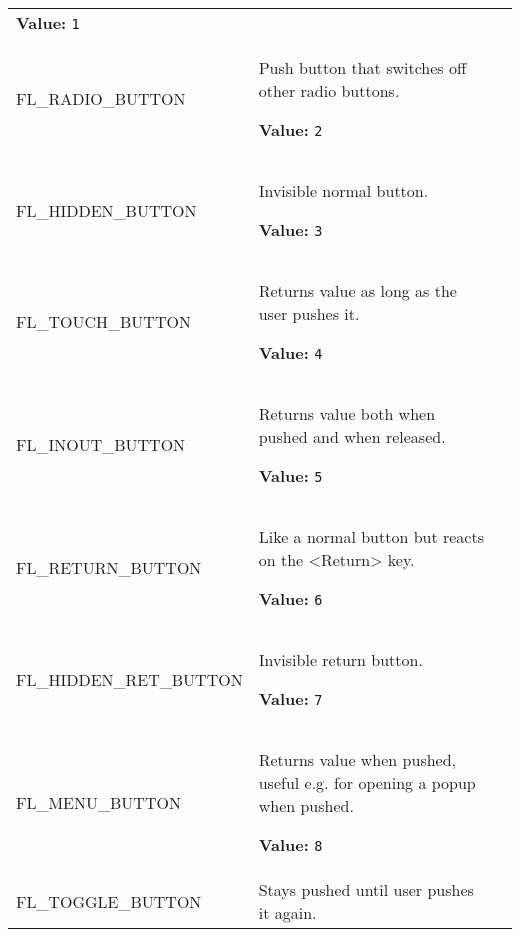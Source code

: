 \begin{longtable}{|p{\varnamewidth}|p{\vardescrwidth}|l}
\textbf{Value:} 
{\tt 1}&\\
\cline{1-2}
\raggedright F\-L\-\_\-R\-A\-D\-I\-O\-\_\-B\-U\-T\-T\-O\-N\- & \raggedright Push button that switches off other radio buttons.

\textbf{Value:} 
{\tt 2}&\\
\cline{1-2}
\raggedright F\-L\-\_\-H\-I\-D\-D\-E\-N\-\_\-B\-U\-T\-T\-O\-N\- & \raggedright Invisible normal button.

\textbf{Value:} 
{\tt 3}&\\
\cline{1-2}
\raggedright F\-L\-\_\-T\-O\-U\-C\-H\-\_\-B\-U\-T\-T\-O\-N\- & \raggedright Returns value as long as the user pushes it.

\textbf{Value:} 
{\tt 4}&\\
\cline{1-2}
\raggedright F\-L\-\_\-I\-N\-O\-U\-T\-\_\-B\-U\-T\-T\-O\-N\- & \raggedright Returns value both when pushed and when released.

\textbf{Value:} 
{\tt 5}&\\
\cline{1-2}
\raggedright F\-L\-\_\-R\-E\-T\-U\-R\-N\-\_\-B\-U\-T\-T\-O\-N\- & \raggedright Like a normal button but reacts on the <Return> key.

\textbf{Value:} 
{\tt 6}&\\
\cline{1-2}
\raggedright F\-L\-\_\-H\-I\-D\-D\-E\-N\-\_\-R\-E\-T\-\_\-B\-U\-T\-T\-O\-N\- & \raggedright Invisible return button.

\textbf{Value:} 
{\tt 7}&\\
\cline{1-2}
\raggedright F\-L\-\_\-M\-E\-N\-U\-\_\-B\-U\-T\-T\-O\-N\- & \raggedright Returns value when pushed, useful e.g. for opening a popup when pushed.

\textbf{Value:} 
{\tt 8}&\\
\cline{1-2}
\raggedright F\-L\-\_\-T\-O\-G\-G\-L\-E\-\_\-B\-U\-T\-T\-O\-N\- & \raggedright Stays pushed until user pushes it again.


\end{longtable}
